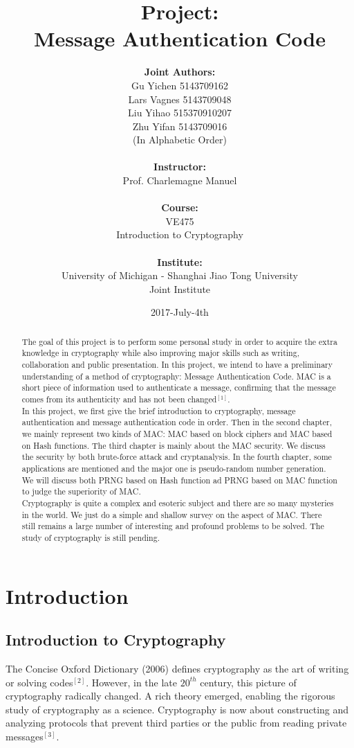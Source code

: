 \documentclass[12pt,a4paper,oneside]{report}
\author{
    \textbf{Joint Authors:}\\
    Gu Yichen 5143709162\\
    Lars Vagnes 5143709048\\ 
    Liu Yihao 515370910207\\
    Zhu Yifan 5143709016\\
    \normalsize{(In Alphabetic Order)}\\
    \\
    \textbf{Instructor:}\\
    Prof. Charlemagne Manuel\\ \\ \textbf{Course:}\\VE475\\ Introduction to Cryptography\\ \\ \textbf{Institute:}\\University of Michigan - Shanghai Jiao Tong University\\Joint Institute}
\title{\textbf{Project:\\Message Authentication Code}}
\date{2017-July-4th}
\begin{document}
\maketitle

\begin{abstract}

The goal of this project is to perform some personal study in order to acquire the extra knowledge in cryptography while also improving major skills such as writing, collaboration and public presentation. In this project, we intend to have a preliminary understanding of a method of cryptography: Message Authentication Code. MAC is a short piece of information used to authenticate a message, confirming that the message comes from its authenticity and has not been changed$^{[1]}$.\\

In this project, we first give the brief introduction to cryptography, message authentication and message authentication code in order. Then in the second chapter, we mainly represent two kinds of MAC: MAC based on block ciphers and MAC based on Hash functions. The third chapter is mainly about the MAC security. We discuss the security by both brute-force attack and cryptanalysis. In the fourth chapter, some applications are mentioned and the major one is pseudo-random number generation. We will discuss both PRNG based on Hash function ad PRNG based on MAC function to judge the superiority of MAC.\\

Cryptography is quite a complex and esoteric subject and there are so many mysteries in the world. We just do a simple and shallow survey on the aspect of MAC. There still remains a large number of interesting and profound problems to be solved. The study of cryptography is still pending.\\

\end{abstract}


\tableofcontents
\chapter{  Introduction}
\section{Introduction to Cryptography}
The Concise Oxford Dictionary (2006) defines cryptography as the art of writing or solving codes$^{[2]}$. However, in the late $20^{th}$ century, this picture of cryptography radically changed. A rich theory emerged, enabling the rigorous study of cryptography as a science. Cryptography is now about constructing and analyzing protocols that prevent third parties or the public from reading private messages$^{[3]}$.
\end{document}
